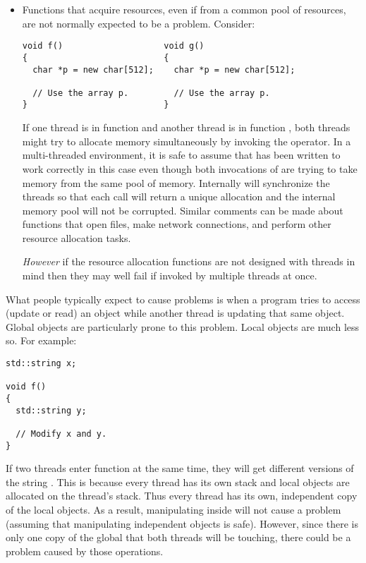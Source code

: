 \begin{itemize}
\item Functions that acquire resources, even if from a common pool of resources, are not
  normally expected to be a problem. Consider:

\begin{lstlisting}
void f()                    void g()
{                           {
  char *p = new char[512];    char *p = new char[512];

  // Use the array p.         // Use the array p.
}                           }
\end{lstlisting}
  
If one thread is in function  and another thread is in function , both
threads might try to allocate memory simultaneously by invoking the  operator. In a
multi-threaded environment, it is safe to assume that  has been written to work
correctly in this case even though both invocations of  are trying to take memory
from the same pool of memory. Internally  will synchronize the threads so that each
call will return a unique allocation and the internal memory pool will not be corrupted. Similar
comments can be made about functions that open files, make network connections, and perform
other resource allocation tasks.
  
\emph{However} if the resource allocation functions are not designed with threads in mind then
they may well fail if invoked by multiple threads at once.

\end{itemize}

What people typically expect to cause problems is when a program tries to access (update or
read) an object while another thread is updating that same object. Global objects are
particularly prone to this problem. Local objects are much less so. For example:

\begin{lstlisting}
std::string x;

void f()
{
  std::string y;

  // Modify x and y.
}
\end{lstlisting}

If two threads enter function  at the same time, they will get different versions
of the string . This is because every thread has its own stack and local objects are
allocated on the thread's stack. Thus every thread has its own, independent copy of the local
objects. As a result, manipulating  inside  will not cause a problem
(assuming that manipulating independent objects is safe). However, since there is only one copy
of the global  that both threads will be touching, there could be a problem caused by
those operations.

